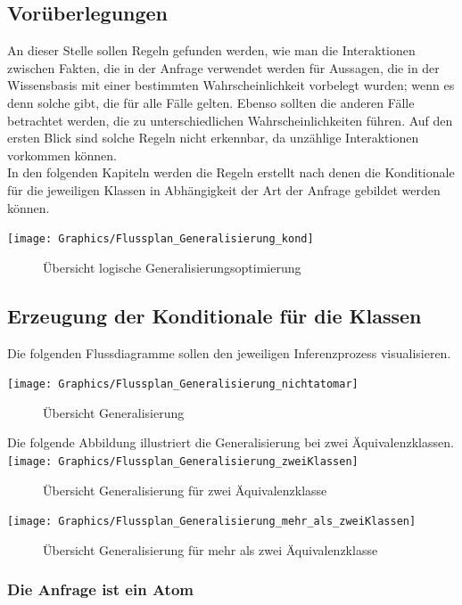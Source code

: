 \documentclass[a4paper, 11pt]{book}
\begin{document}
\subsection{Vorüberlegungen}
An dieser Stelle sollen Regeln gefunden werden, wie man die Interaktionen zwischen Fakten, die in der Anfrage verwendet werden für Aussagen, die in der Wissensbasis mit einer bestimmten Wahrscheinlichkeit vorbelegt wurden; wenn es denn solche gibt, die für alle Fälle gelten. Ebenso sollten die anderen Fälle betrachtet werden, die zu unterschiedlichen Wahrscheinlichkeiten führen. Auf den ersten Blick sind solche Regeln nicht erkennbar, da unzählige Interaktionen vorkommen können.\\
In den folgenden Kapiteln werden die Regeln erstellt nach denen die Konditionale für die jeweiligen Klassen in Abhängigkeit der Art der Anfrage gebildet werden können.\\
\newpage


\texttt{[image: Graphics/Flussplan\_Generalisierung\_kond]}
\begin{figure}[h]
	\caption{Übersicht logische Generalisierungsoptimierung}
	\label{Fig_Log_Genopt}
\end{figure}


\subsection{Erzeugung der Konditionale für die Klassen}
Die folgenden Flussdiagramme sollen den jeweiligen Inferenzprozess visualisieren.

\texttt{[image: Graphics/Flussplan\_Generalisierung\_nichtatomar]}
\begin{figure}[h]
	\caption{Übersicht Generalisierung}
	\label{Fig_General}
\end{figure}
\newpage
Die folgende Abbildung illustriert die Generalisierung bei zwei Äquivalenzklassen.
\texttt{[image: Graphics/Flussplan\_Generalisierung\_zweiKlassen]}
\begin{figure}[h]
	\caption{Übersicht Generalisierung für zwei Äquivalenzklasse}
	\label{Fig_ZweiKlassen}
\end{figure}

\texttt{[image: Graphics/Flussplan\_Generalisierung\_mehr\_als\_zweiKlassen]}
\begin{figure}[h]
	\caption{Übersicht Generalisierung für mehr als zwei Äquivalenzklasse}
	\label{Fig_Mehr_Klassen}
\end{figure}
\subsubsection {Die Anfrage ist ein Atom} 
\end{document}
